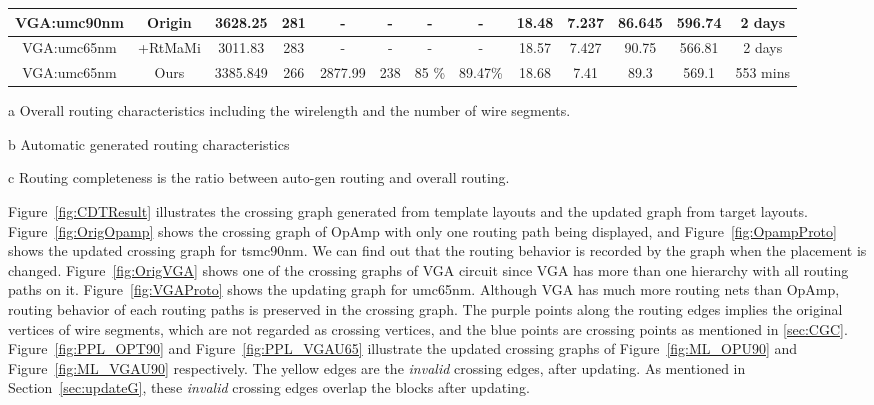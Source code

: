\begin{table}[ht]
\begin{threeparttable}
\begin{center}
\begin{tabular}{|c|c|c|c|c|c|c|c|c|c|c|c|c|}
        \hline
        VGA:umc90nm & Origin &  3628.25  &  281& -&-&- & - & 18.48 & 7.237&86.645 & 596.74 & 2 days \\
        \hline
        VGA:umc65nm & \cite{msc-bhattacharya-tcad06}+RtMaMi &  3011.83& 283 & -& - &- & - & 18.57 & 7.427 &90.75& 566.81&   2 days \\
        \hline
        VGA:umc65nm & Ours & 3385.849& 266 &  2877.99& 238 & 85 \% & 89.47\%&18.68 & 7.41& 89.3 & 569.1& 553 mins  \\
        \hline
      \end{tabular}
      \begin{tablenotes}
        \item [a] Overall routing characteristics including the wirelength and the number of wire segments. 
        \item [b] Automatic generated routing characteristics
        \item [c] Routing completeness is the ratio between auto-gen routing and overall routing. 
      \end{tablenotes}
      \end{center}
      \end{threeparttable}
    \end{table} 
       

    Figure~\ref{fig:CDTResult} illustrates the crossing graph generated from template layouts and the updated graph from target layouts. Figure~\ref{fig:OrigOpamp} shows the crossing graph of OpAmp with only one routing path being displayed, and Figure~\ref{fig:OpampProto} shows the updated crossing graph for tsmc90nm. We can find out that the routing behavior is recorded by the graph when the placement is changed. Figure~\ref{fig:OrigVGA} shows one of the crossing graphs of VGA circuit since VGA has more than one hierarchy with all routing paths on it. Figure~\ref{fig:VGAProto} shows the updating graph for umc65nm. Although VGA has much more routing nets than OpAmp, routing behavior of each routing paths is preserved in the crossing graph. The purple points along the routing edges implies the original vertices of wire segments, which are not regarded as crossing vertices, and the blue points are crossing points as mentioned in \ref{sec:CGC}. Figure~\ref{fig:PPL_OPT90} and Figure~\ref{fig:PPL_VGAU65} illustrate the updated crossing graphs of Figure~\ref{fig:ML_OPU90} and Figure~\ref{fig:ML_VGAU90} respectively. The yellow edges are the {\it invalid} crossing edges, after updating. As mentioned in Section~\ref{sec:updateG}, these {\it invalid} crossing edges overlap the blocks after updating.

